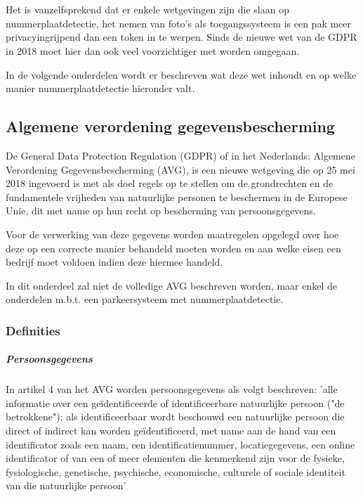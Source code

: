 
\chapter{}
\label{ch:wetgeving-nummerplaatdetectie}

Het is vanzelfsprekend dat er enkele wetgevingen zijn die slaan op nummerplaatdetectie, het nemen van foto's als toegangssysteem is een pak meer privacyingrijpend dan een token in te werpen. Sinds de nieuwe wet van de GDPR in 2018 moet hier dan ook veel voorzichtiger met worden omgegaan.

In de volgende onderdelen wordt er beschreven wat deze wet inhoudt en op welke manier nummerplaatdetectie hieronder valt.

\section{Algemene verordening gegevensbescherming}
De General Data Protection Regulation (GDPR) of in het Nederlands: Algemene Verordening Gegevensbescherming (AVG), is een nieuwe wetgeving die op 25 mei 2018 ingevoerd is met als doel regels op te stellen om de grondrechten en de fundamentele vrijheden van natuurlijke personen te beschermen in de Europese Unie, dit met name op hun recht op bescherming van persoonsgegevens. \autocite{avg2018privacy}

Voor de verwerking van deze gegevens worden maatregelen opgelegd over hoe deze op een correcte manier behandeld moeten worden en aan welke eisen een bedrijf moet voldoen indien deze hiermee handeld.

In dit onderdeel zal niet de volledige AVG beschreven worden, maar enkel de onderdelen m.b.t. een parkeersysteem met nummerplaatdetectie.

\subsection{Definities}

\paragraph{Persoonsgegevens}
In artikel 4 van het AVG worden persoonsgegevens als volgt beschreven: 'alle informatie over een geïdentificeerde of identificeerbare natuurlijke persoon ("de betrokkene"); als identificeerbaar wordt beschouwd een natuurlijke persoon die direct of indirect kan worden geïdentificeerd, met name aan de hand van een identificator zoals een naam, een identificatienummer, locatiegegevens, een online identificator of van een of meer elementen die kenmerkend zijn voor de fysieke, fysiologische, genetische, psychische, economische, culturele of sociale identiteit van die natuurlijke persoon' \autocite{avg2018privacy}

